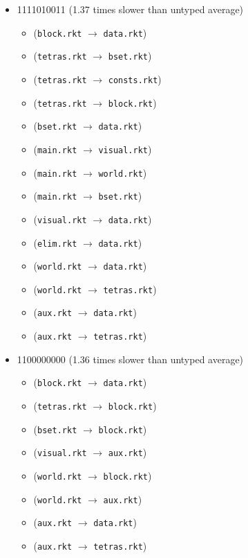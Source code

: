 \documentclass{article}
\newcommand{\mono}[1]{\texttt{#1}}
\begin{document}
\begin{itemize}
\item 1111010011 (1.37 times slower than untyped average)
  \begin{itemize}
  \item (\mono{block.rkt} $\rightarrow$ \mono{data.rkt})
  \item (\mono{tetras.rkt} $\rightarrow$ \mono{bset.rkt})
  \item (\mono{tetras.rkt} $\rightarrow$ \mono{consts.rkt})
  \item (\mono{tetras.rkt} $\rightarrow$ \mono{block.rkt})
  \item (\mono{bset.rkt} $\rightarrow$ \mono{data.rkt})
  \item (\mono{main.rkt} $\rightarrow$ \mono{visual.rkt})
  \item (\mono{main.rkt} $\rightarrow$ \mono{world.rkt})
  \item (\mono{main.rkt} $\rightarrow$ \mono{bset.rkt})
  \item (\mono{visual.rkt} $\rightarrow$ \mono{data.rkt})
  \item (\mono{elim.rkt} $\rightarrow$ \mono{data.rkt})
  \item (\mono{world.rkt} $\rightarrow$ \mono{data.rkt})
  \item (\mono{world.rkt} $\rightarrow$ \mono{tetras.rkt})
  \item (\mono{aux.rkt} $\rightarrow$ \mono{data.rkt})
  \item (\mono{aux.rkt} $\rightarrow$ \mono{tetras.rkt})
  \end{itemize}
\item 1100000000 (1.36 times slower than untyped average)
  \begin{itemize}
  \item (\mono{block.rkt} $\rightarrow$ \mono{data.rkt})
  \item (\mono{tetras.rkt} $\rightarrow$ \mono{block.rkt})
  \item (\mono{bset.rkt} $\rightarrow$ \mono{block.rkt})
  \item (\mono{visual.rkt} $\rightarrow$ \mono{aux.rkt})
  \item (\mono{world.rkt} $\rightarrow$ \mono{block.rkt})
  \item (\mono{world.rkt} $\rightarrow$ \mono{aux.rkt})
  \item (\mono{aux.rkt} $\rightarrow$ \mono{data.rkt})
  \item (\mono{aux.rkt} $\rightarrow$ \mono{tetras.rkt})
  \end{itemize}


\end{itemize}
\end{document}

